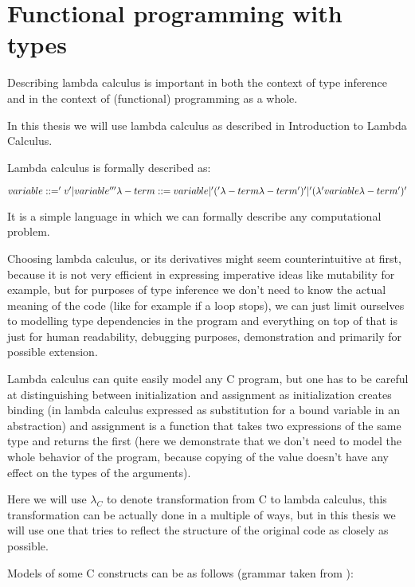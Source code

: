 \chapter{Functional programming with types}

Describing lambda calculus is important in both the context of type inference and in the context of (functional)
programming as a whole.

In this thesis we will use lambda calculus as described in Introduction to Lambda Calculus.  %

Lambda calculus is formally described as:

$
    variable ::= 'v' | variable ''' \\
    \lambda-term ::= variable | '(' \lambda-term \lambda-term ')' |  '(\lambda' variable \lambda-term ')'
$


It is a simple language in which we can formally describe any computational problem.

Choosing lambda calculus, or its derivatives might seem counterintuitive at first, because it
is not very efficient in expressing imperative ideas like mutability for example, but for
purposes of type inference we don't need to know the actual meaning of the code (like for example
if a loop stops), we can just limit ourselves to modelling type dependencies in the program and
everything on top of that is just for human readability, debugging purposes, demonstration and
primarily for possible extension.

Lambda calculus can quite easily model any C program, but one has to be careful at distinguishing
between initialization and assignment as initialization creates binding (in lambda calculus expressed
as substitution for a bound variable in an abstraction) and assignment is a function that takes two
expressions of the same type and returns the first (here we demonstrate that we don't need to
model the whole behavior of the program, because copying of the value doesn't have any effect on
the types of the arguments).

Here we will use $\lambda_C$ to denote transformation from C to lambda calculus,
this transformation can be actually done in a multiple of ways, but in this thesis we will use one that tries to
reflect the structure of the original code as closely as possible.

Models of some C constructs can be as follows (grammar taken from ): %

